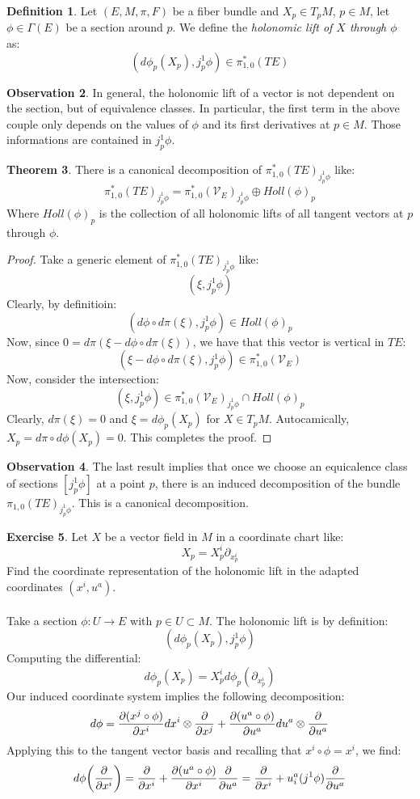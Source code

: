 \documentclass[12pt,a4paper]{report}
\theoremstyle{definition}
\newtheorem{Def}{Definition}[chapter]
\theoremstyle{Theorem}
\newtheorem{Theo}[Def]{Theorem}
\theoremstyle{definition}
\newtheorem{Exe}[Def]{Exercise}
\theoremstyle{definition}
\newtheorem{Obs}[Def]{Observation}
\begin{document}
	\begin{Def}
		Let $(E,M,\pi,F)$ be a fiber bundle and $X_p\in T_pM$, $p\in M$, let $\phi\in\Gamma(E)$ be a section around $p$. We define the \textit{holonomic lift of $X$ through $\phi$} as:
		$$(d\phi_p(X_p),j^1_p\phi)\in \pi_{1,0}^*(TE)$$
	\end{Def}
	\begin{Obs}
		In general, the holonomic lift of a vector is not dependent on the section, but of equivalence classes. In particular, the first term in the above couple only depends on the values of $\phi$ and its first derivatives at $p\in M$. Those informations are contained in $j^1_p\phi$.
	\end{Obs}
	\begin{Theo}
		There is a canonical decomposition of $\pi_{1,0}^*(TE)_{j^1_p\phi}$ like:
		$$\pi_{1,0}^*(TE)_{j^1_p\phi}=\pi_{1,0}^*(\mathcal{V}_E)_{j^1_p\phi}\oplus Holl(\phi)_p$$
		Where $Holl(\phi)_p$ is the collection of all holonomic lifts of all tangent vectors at $p$ through $\phi$. 
	\end{Theo}
	\begin{proof}
		Take a generic element of $\pi_{1,0}^*(TE)_{j^1_p\phi}$ like: 
		$$(\xi,j^1_p\phi)$$
		Clearly, by definitioin:
		$$(d\phi\circ d\pi(\xi),j^1_p\phi)\in Holl(\phi)_p$$
		Now, since $0=d\pi(\xi-d\phi\circ d\pi(\xi))$, we have that this vector is vertical in $TE$:
		$$(\xi-d\phi\circ d\pi(\xi),j^1_p\phi)\in \pi_{1,0}^*(\mathcal{V}_E)$$
		Now, consider the intersection:
		$$(\xi,j^1_p\phi)\in \pi_{1,0}^*(\mathcal{V}_E)_{j^1_p\phi}\cap Holl(\phi)_p$$
		Clearly, $d\pi(\xi)=0$ and $\xi=d\phi_p(X_p)$ for $X\in T_pM$. Autocamically, $X_p=d\pi\circ d\phi(X_p)=0$. This completes the proof.
	\end{proof}
	\begin{Obs}
		The last result implies that once we choose an equicalence class of sections $[j^1_p\phi]$ at a point $p$, there is an induced decomposition of the bundle $\pi_{1,0}(TE)_{j^1_p\phi}$. This is a canonical decomposition.
	\end{Obs}
	\begin{Exe}
		Let $X$ be a vector field in $M$ in a coordinate chart like:
		$$X_p=X^i_p\partial_{x_p^i}$$
		Find the coordinate representation of the holonomic lift in the adapted coordinates $(x^i,u^a)$.\\
		\\
		Take a section $\phi:U\rightarrow E$ with $p\in U\subset M$. The holonomic lift is by definition:
		$$(d\phi_p(X_p),j^1_p\phi)$$
		Computing the differential:
		$$d\phi_p(X_p)=X_p^id\phi_p(\partial_{x_p^i})$$
		Our induced coordinate system implies the following decomposition:
		$$d\phi={\partial (x^j\circ\phi)\over \partial x^i}dx^i\otimes {\partial \over \partial x^j}+{\partial (u^a\circ\phi) \over \partial u^a}du^a\otimes {\partial\over \partial u^a}$$
	    Applying this to the tangent vector basis and recalling that $x^i\circ \phi=x^i$, we find:
		$$d\phi\bigg({\partial\over \partial x^i}\bigg)={\partial \over \partial x^i}+{\partial (u^a\circ\phi) \over \partial x^i}{\partial\over \partial u^a}={\partial \over \partial x^i}+u^a_i(j^1\phi){\partial\over \partial u^a}$$
	\end{Exe}
\end{document}
